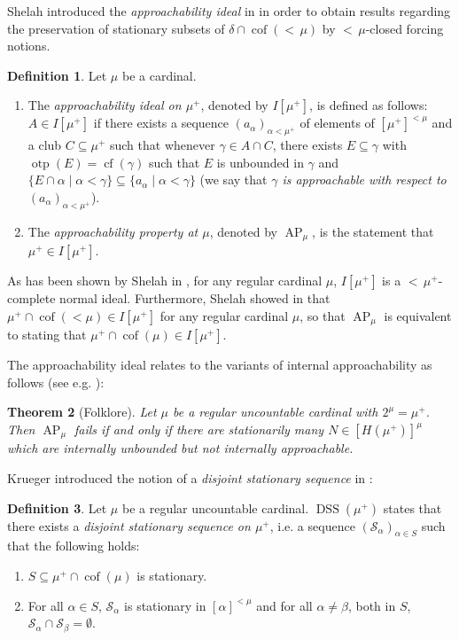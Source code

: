 \documentclass[a4paper]{amsart}
\theoremstyle{definition}
\newtheorem{mydef}{Definition}[section]
\theoremstyle{remark}
\theoremstyle{plain}
\newtheorem{mysen}[mydef]{Theorem}
\numberwithin{mydef}{section}
\DeclareMathOperator{\cof}{cof}
\DeclareMathOperator{\otp}{otp}
\DeclareMathOperator{\cf}{cf}
\DeclareMathOperator{\AP}{AP}
\DeclareMathOperator{\DSS}{DSS}
\begin{document}
	Shelah introduced the \emph{approachability ideal} in \cite{ShelahApproachability} in order to obtain results regarding the preservation of stationary subsets of $\delta\cap\cof({<}\,\mu)$ by ${<}\,\mu$-closed forcing notions.
	
	\begin{mydef}
		Let $\mu$ be a cardinal.
		\begin{enumerate}
			\item The \emph{approachability ideal on $\mu^+$}, denoted by $I[\mu^+]$, is defined as follows: $A\in I[\mu^+]$ if there exists a sequence $(a_{\alpha})_{\alpha<\mu^+}$ of elements of $[\mu^+]^{<\mu}$ and a club $C\subseteq\mu^+$ such that whenever $\gamma\in A\cap C$, there exists $E\subseteq\gamma$ with $\otp(E)=\cf(\gamma)$ such that $E$ is unbounded in $\gamma$ and $\{E\cap\alpha\;|\;\alpha<\gamma\}\subseteq\{a_{\alpha}\;|\;\alpha<\gamma\}$ (we say that \emph{$\gamma$ is approachable with respect to $(a_{\alpha})_{\alpha<\mu^+}$}).
			\item The \emph{approachability property at $\mu$}, denoted by $\AP_{\mu}$, is the statement that $\mu^+\in I[\mu^+]$.
		\end{enumerate}
	\end{mydef}
	
	As has been shown by Shelah in \cite{ShelahApproachability}, for any regular cardinal $\mu$, $I[\mu^+]$ is a ${<}\,\mu^+$-complete normal ideal. Furthermore, Shelah showed in \cite[Lemma 4.4]{ShelahApproachability} that $\mu^+\cap\cof(<\mu)\in I[\mu^+]$ for any regular cardinal $\mu$, so that $\AP_{\mu}$ is equivalent to stating that $\mu^+\cap\cof(\mu)\in I[\mu^+]$.
	
	The approachability ideal relates to the variants of internal approachability as follows (see e.g. \cite[Lemma 1]{CoxFAAppSSR}):
	
	\begin{mysen}[Folklore]\label{CoxThm}
		Let $\mu$ be a regular uncountable cardinal with $2^{\mu}=\mu^+$. Then $\AP_{\mu}$ fails if and only if there are stationarily many $N\in[H(\mu^+)]^{\mu}$ which are internally unbounded but not internally approachable.
	\end{mysen}
	
	Krueger introduced the notion of a \emph{disjoint stationary sequence} in \cite{KruegerApplicMSI}:
	
	\begin{mydef}
		Let $\mu$ be a regular uncountable cardinal. $\DSS(\mu^+)$ states that there exists a \emph{disjoint stationary sequence on $\mu^+$}, i.e. a sequence $(\mathcal{S}_{\alpha})_{\alpha\in S}$ such that the following holds:
		\begin{enumerate}
			\item $S\subseteq\mu^+\cap\cof(\mu)$ is stationary.
			\item For all $\alpha\in S$, $\mathcal{S}_{\alpha}$ is stationary in $[\alpha]^{<\mu}$ and for all $\alpha\neq\beta$, both in $S$, $\mathcal{S}_{\alpha}\cap\mathcal{S}_{\beta}=\emptyset$.
		\end{enumerate}
	\end{mydef}
	
\end{document}
